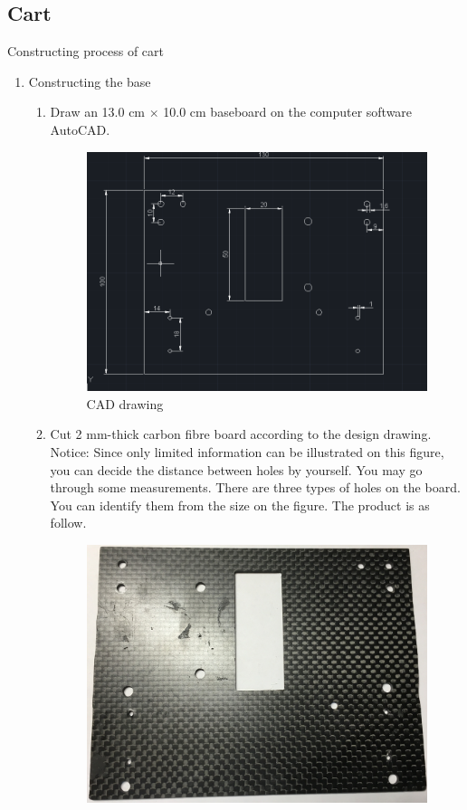 \subsection{Cart}
Constructing process of cart
\begin{enumerate}
\item Constructing the base
	\begin{enumerate}
	\item	Draw an 13.0 cm $\times$ 10.0 cm baseboard on the computer software AutoCAD.\\
	\begin{figure}[H]
	\begin{center}
	\includegraphics[width = 10cm]{figure/procedure/p1}
	\end{center}
 	\caption{CAD drawing \label{fig:cad}}
	\end{figure}
	\item Cut 2 mm-thick carbon fibre board according to the design drawing. Notice: Since only limited information can be illustrated on this figure, you can decide the distance between holes by yourself. You may go through some measurements. There are three types of holes on the board. You can identify them from the size on the figure. The product is as follow. \\
	\begin{figure}[H]
	\begin{center}
	\includegraphics[width = 10 cm]{figure/procedure/p2}

\end{center}
\end{figure}
\end{enumerate}
\end{enumerate}
